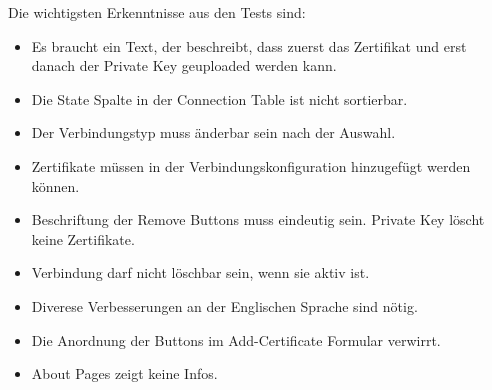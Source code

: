 Die wichtigsten Erkenntnisse aus den Tests sind:
\begin{itemize}
    \item Es braucht ein Text, der beschreibt, dass zuerst das Zertifikat und erst danach der Private Key geuploaded werden kann.
    \item Die State Spalte in der Connection Table ist nicht sortierbar.
    \item Der Verbindungstyp muss änderbar sein nach der Auswahl.
    \item Zertifikate müssen in der Verbindungskonfiguration hinzugefügt werden können.
    \item Beschriftung der Remove Buttons muss eindeutig sein. Private Key löscht keine Zertifikate.
    \item Verbindung darf nicht löschbar sein, wenn sie aktiv ist.
    \item Diverese Verbesserungen an der Englischen Sprache sind nötig.
    \item Die Anordnung der Buttons im Add-Certificate Formular verwirrt.
    \item About Pages zeigt keine Infos.
\end{itemize}
